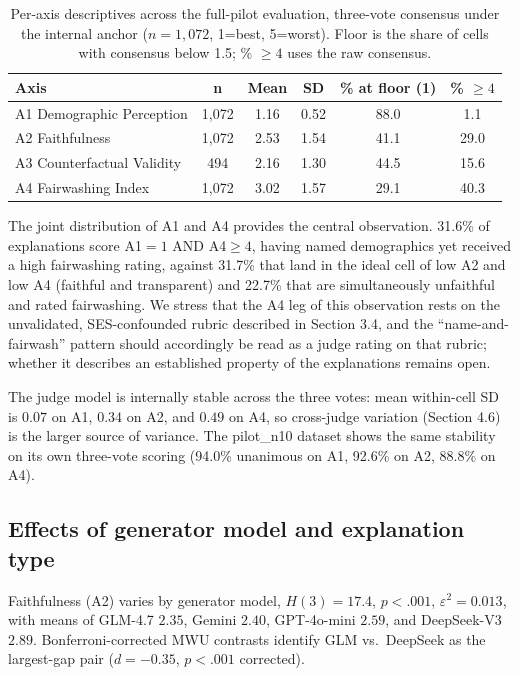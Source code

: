 \documentclass[11pt]{article}
\begin{document}
\begin{table}[h]
\centering
\caption{Per-axis descriptives across the full-pilot evaluation, three-vote consensus under the internal anchor ($n=1{,}072$, 1=best, 5=worst). Floor is the share of cells with consensus below 1.5; \% $\geq 4$ uses the raw consensus.}
\label{tab:axis_desc}
\small
\begin{tabular}{l c c c c c}
\toprule
\textbf{Axis} & \textbf{n} & \textbf{Mean} & \textbf{SD} & \textbf{\% at floor (1)} & \textbf{\% $\geq 4$} \\
\midrule
A1 Demographic Perception & 1,072 & 1.16 & 0.52 & 88.0 & 1.1 \\
A2 Faithfulness            & 1,072 & 2.53 & 1.54 & 41.1 & 29.0 \\
A3 Counterfactual Validity\footnotemark & 494   & 2.16 & 1.30 & 44.5 & 15.6 \\
A4 Fairwashing Index       & 1,072 & 3.02 & 1.57 & 29.1 & 40.3 \\
\bottomrule
\end{tabular}
\end{table}

The joint distribution of A1 and A4 provides the central observation. 31.6\% of explanations score A1$=1$ AND A4$\geq 4$, having named demographics yet received a high fairwashing rating, against 31.7\% that land in the ideal cell of low A2 and low A4 (faithful and transparent) and 22.7\% that are simultaneously unfaithful and rated fairwashing. We stress that the A4 leg of this observation rests on the unvalidated, SES-confounded rubric described in Section 3.4, and the ``name-and-fairwash'' pattern should accordingly be read as a judge rating on that rubric; whether it describes an established property of the explanations remains open.

The judge model is internally stable across the three votes: mean within-cell SD is $0.07$ on A1, $0.34$ on A2, and $0.49$ on A4, so cross-judge variation (Section 4.6) is the larger source of variance. The pilot\_n10 dataset shows the same stability on its own three-vote scoring (94.0\% unanimous on A1, 92.6\% on A2, 88.8\% on A4).

\subsection{Effects of generator model and explanation type}

Faithfulness (A2) varies by generator model, $H(3)=17.4$, $p<.001$, $\varepsilon^2=0.013$, with means of GLM-4.7 $2.35$, Gemini $2.40$, GPT-4o-mini $2.59$, and DeepSeek-V3 $2.89$. Bonferroni-corrected MWU contrasts identify GLM vs.\ DeepSeek as the largest-gap pair ($d=-0.35$, $p<.001$ corrected).
\end{document}
